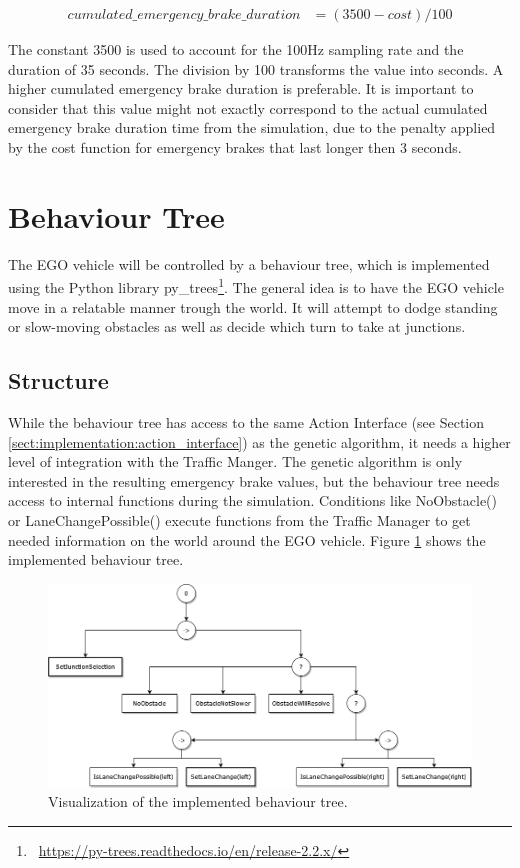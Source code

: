 \begin{equation} 
	\begin{split}
		cumulated\_emergency\_brake\_duration & = (3500 - cost) / 100
	\end{split}
	\label{equ:implementation:modified_cost}
\end{equation}

The constant 3500 is used to account for the 100Hz sampling rate and the duration of 35 seconds. The division by 100 transforms the value into seconds. A higher cumulated emergency brake duration is preferable. It is important to consider that this value might not exactly correspond to the actual cumulated emergency brake duration time from the simulation, due to the penalty applied by the cost function for emergency brakes that last longer then 3 seconds.

\section{Behaviour Tree}
The EGO vehicle will be controlled by a behaviour tree, which is implemented using the Python library py\_trees\footnote{~\href{https://py-trees.readthedocs.io/en/release-2.2.x/}{https://py-trees.readthedocs.io/en/release-2.2.x/}}. The general idea is to have the EGO vehicle move in a relatable manner trough the world. It will attempt to dodge standing or slow-moving obstacles as well as decide which turn to take at junctions.

\subsection{Structure}
While the behaviour tree has access to the same Action Interface (see Section \ref{sect:implementation:action_interface}) as the genetic algorithm, it needs a higher level of integration with the Traffic Manger. The genetic algorithm is only interested in the resulting emergency brake values, but the behaviour tree needs access to internal functions during the simulation. Conditions like NoObstacle() or LaneChangePossible() execute functions from the Traffic Manager to get needed information on the world around the EGO vehicle. Figure \ref{fig:implementation:bt} shows the implemented behaviour tree.

\begin{figure}[ht] 
	\includegraphics[width=1\linewidth]{figures/behaviorTree}
	\caption{Visualization of the implemented behaviour tree.}
	\label{fig:implementation:bt}
\end{figure}

